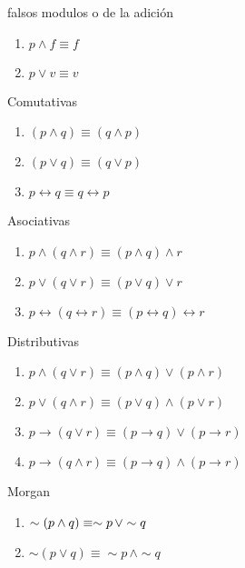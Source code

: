 \begin{ley}{falsos modulos o de la adición}
\begin{enumerate}
\item $p\wedge f\equiv f$
\item $p\vee v\equiv v$
\end{enumerate}
\end{ley}

\begin{ley}{Comutativas}
\begin{enumerate}
\item $\left(p\wedge q\right)\equiv\left(q\wedge p\right)$
\item $\left(p\vee q\right)\equiv\left(q\vee p\right)$
\item $p\leftrightarrow q\equiv q\leftrightarrow p$
\end{enumerate}
\end{ley}

\begin{ley}{Asociativas}
\begin{enumerate}
\item $p\wedge\left(q\wedge r\right)\equiv\left(p\wedge q\right)\wedge r$
\item $p\vee\left(q\vee r\right)\equiv\left(p\vee q\right)\vee r$
\item $p\leftrightarrow\left(q\leftrightarrow r\right)\equiv\left(p\leftrightarrow q\right)\leftrightarrow r$
\end{enumerate}
\end{ley}

\begin{ley}{Distributivas}
\begin{enumerate}
\item $p\wedge\left(q\vee r\right)\equiv\left(p\wedge q\right)\vee\left(p\wedge r\right)$
\item $p\vee\left(q\wedge r\right)\equiv\left(p\vee q\right)\wedge\left(p\vee r\right)$
\item $p\rightarrow\left(q\vee r\right)\equiv\left(p\rightarrow q\right)\vee\left(p\rightarrow r\right)$
\item $p\rightarrow\left(q\wedge r\right)\equiv\left(p\rightarrow q\right)\wedge\left(p\rightarrow r\right)$
\end{enumerate}
\end{ley}

\begin{ley}{Morgan}
\begin{enumerate}
\item $\sim\left(p\wedge q\right)\equiv\sim p\text{\,}\vee\sim q$
\item $\sim\left(p\vee q\right)\equiv\sim p\,\wedge\sim q$
\end{enumerate}
\end{ley}

